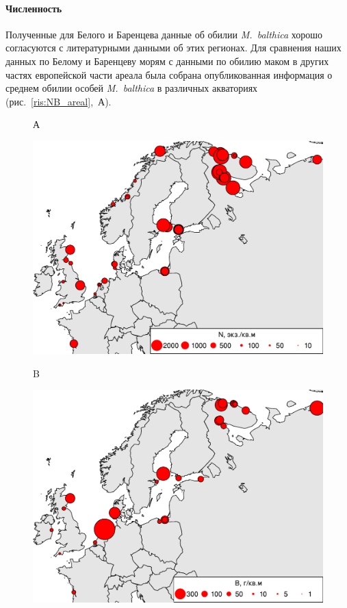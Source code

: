 {\paragraph{Численность}
Полученные для Белого и Баренцева данные об обилии \textit{M.~balthica} хорошо согласуются с литературными данными об этих регионах.
Для сравнения наших данных по Белому и Баренцеву морям с данными по обилию маком в других частях европейской части ареала была собрана опубликованная информация о среднем обилии особей {\it M.~balthica} в различных акваториях (рис.~\ref{ris:NB_areal},~А).
	\begin{figure}[]
		\begin{minipage}[b]{.5\linewidth}
	{\small А}
			\begin{center}
			    \includegraphics[width=\textwidth]{../macrodistribution/Nmean_ru1.pdf}
			\end{center}
		\end{minipage}
	\hfil %
		\begin{minipage}[b]{.5\linewidth}
			{\small B}
			\begin{center}
				\includegraphics[width=\textwidth]{../macrodistribution/Bmean_ru1.pdf}

\end{center}
\end{minipage}
\end{figure}}
